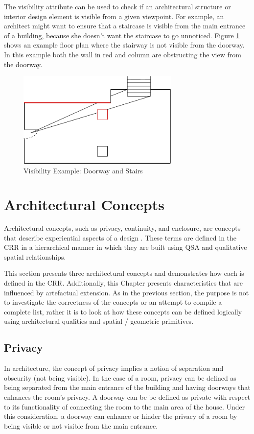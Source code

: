\documentclass[12pt]{ucthesis}
\begin{document}
The visibility attribute can be used to check if an architectural structure or interior design element is visible from a given viewpoint. For example, an architect might want to ensure that a staircase is visible from the main entrance of a building, because she doesn't want the staircase to go unnoticed. Figure \ref{visibility-door-stair} shows an example floor plan where the stairway is not visible from the doorway. In this example both the wall in red and column are obstructing the view from the doorway. 

\begin{figure}[H]
\centering
\includegraphics[width=80mm]{visibility-stair-door}
\caption{Visibility Example: Doorway and Stairs}
\label{visibility-door-stair}
\end{figure}


\section{Architectural Concepts}
Architectural concepts, such as privacy, continuity, and enclosure, are concepts that describe experiential aspects of a design \cite{Koile}. These terms are defined in the CRR in a hierarchical manner in which they are built using QSA and qualitative spatial relationships. 

This section presents three architectural concepts and demonstrates how each is defined in the CRR. Additionally, this Chapter presents characteristics that are influenced by artefactual extension. As in the previous section, the purpose is not to investigate the correctness of the concepts or an attempt to compile a complete list, rather it is to look at how these concepts can be defined logically using architectural qualities and spatial / geometric primitives.

\subsection{Privacy}
In architecture, the concept of privacy implies a notion of separation and obscurity (not being visible). In the case of a room, privacy can be defined as being separated from the main entrance of the building and having doorways that enhances the room's privacy. A doorway can be be defined as private with respect to its functionality of connecting the room to the main area of the house. Under this consideration, a doorway can enhance or hinder the privacy of a room by being visible or not visible from the main entrance.
\end{document}
